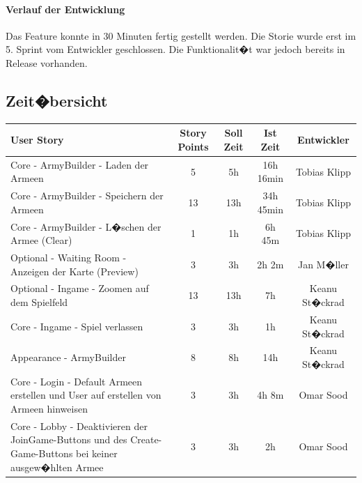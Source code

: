 \documentclass[12pt, titlepage]{scrartcl}
\newcommand{\RN}[1]{%
	\textup{\uppercase\expandafter{\romannumeral#1}}%
}
\begin{document}
			\paragraph{Verlauf der Entwicklung} 
			Das Feature konnte in 30 Minuten fertig gestellt werden. Die Storie wurde erst im 5. Sprint vom Entwickler geschlossen. Die Funktionalit�t war jedoch bereits in Release \RN{2} vorhanden.
			
			\newpage
			
			\subsection{Zeit�bersicht}
			\begin{center}
				\begin{longtable}{p{6cm} c c c c }
					
					User Story	& Story Points & Soll Zeit & Ist Zeit & Entwickler\\
					\toprule
					\endhead
					Core - ArmyBuilder - Laden der Armeen & 5 & 5h & 16h 16min & Tobias Klipp \\ \hline 
					
					Core - ArmyBuilder - Speichern der Armeen & 13 & 13h & 34h 45min & Tobias Klipp \\ \hline
					
					Core - ArmyBuilder - L�schen der Armee (Clear) & 1 & 1h & 6h 45m & Tobias Klipp \\ \hline
					
					Optional - Waiting Room - Anzeigen der Karte (Preview) & 3 & 3h & 2h 2m& Jan M�ller \\ \hline
					
					Optional - Ingame - Zoomen auf dem Spielfeld & 13 & 13h & 7h & Keanu St�ckrad \\ \hline
					
					Core - Ingame - Spiel verlassen & 3 & 3h & 1h & Keanu St�ckrad\\ \hline
					
					Appearance - ArmyBuilder & 8 & 8h & 14h & Keanu St�ckrad\\ \hline
					
					Core - Login - Default Armeen erstellen und User auf erstellen von Armeen hinweisen & 3 & 3h & 4h 8m & Omar Sood\\ \hline
					
					Core - Lobby - Deaktivieren der JoinGame-Buttons und des Create-Game-Buttons bei keiner ausgew�hlten Armee & 3 & 3h & 2h & Omar Sood\\ \hline
					

\end{longtable}
\end{center}
\end{document}
